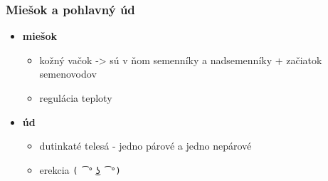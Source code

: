 \documentclass[
]{article}
\providecommand{\tightlist}{%
  \setlength{\itemsep}{0pt}\setlength{\parskip}{0pt}}
\begin{document}
\hypertarget{mieux161ok-a-pohlavnuxfd-uxfad}{%
\subsubsection{Miešok a pohlavný
úd}\label{mieux161ok-a-pohlavnuxfd-uxfad}}

\begin{itemize}
\tightlist
\item
  \textbf{miešok}

  \begin{itemize}
  \tightlist
  \item
    kožný vačok -\textgreater{} sú v ňom semenníky a nadsemenníky +
    začiatok semenovodov
  \item
    regulácia teploty
  \end{itemize}
\item
  \textbf{úd}

  \begin{itemize}
  \tightlist
  \item
    dutinkaté telesá - jedno párové a jedno nepárové
  \item
    erekcia \texttt{(\ ͡°\ ͜ʖ\ ͡°)}
  \end{itemize}
\end{itemize}
\end{document}
